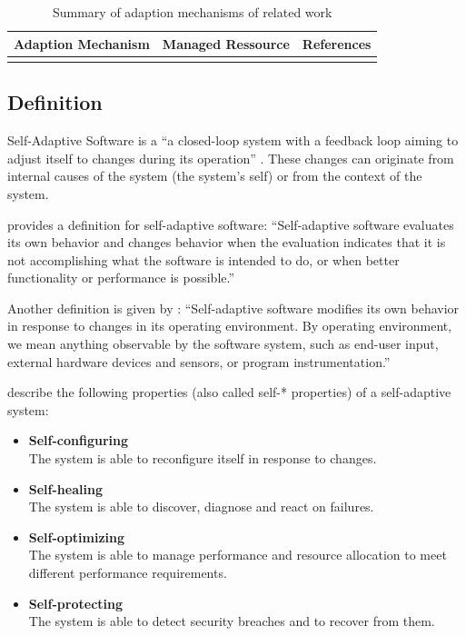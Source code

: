 \begin{table}
	\centering
	\begin{tabularx}{\textwidth}{@{} l X X @{}}
		\caption{Summary of adaption mechanisms of related work}\label{table:ch03_summary_adaption_mechanisms}\\
		\toprule
		\bfseries Adaption Mechanism & \bfseries Managed Ressource & \bfseries References\\
		\midrule
		\\
		\bottomrule
	\end{tabularx}
\end{table}

\subsection{Definition}
Self-Adaptive Software is a ``a closed-loop system with a feedback loop aiming to adjust itself to changes during its operation'' \citep{Salehie:2009pi}. These changes can originate from internal causes of the system (the system's self) or from the context of the system.

\citet{Laddaga:2008ff} provides a definition for self-adaptive software: ``Self-adaptive software evaluates its own behavior and changes behavior when the evaluation indicates that it is not accomplishing what the software is intended to do, or when better functionality or performance is possible.'' 

Another definition is given by \citet{Oreizy:1999lh}: ``Self-adaptive software modifies its own behavior in response to changes in its operating environment. By operating environment, we mean anything observable by the software system, such as end-user input, external hardware devices and sensors, or program instrumentation.''

\cite{Salehie:2009pi} describe the following properties (also called self-* properties) of a self-adaptive system:
\begin{itemize}
	\item \textbf{Self-configuring}\\
	The system is able to reconfigure itself in response to changes.
	\item \textbf{Self-healing}\\
	The system is able to discover, diagnose and react on failures.
	\item \textbf{Self-optimizing}\\
	The system is able to manage performance and resource allocation to meet different performance requirements.
	\item \textbf{Self-protecting}\\
	The system is able to detect security breaches and to recover from them.
\end{itemize}

